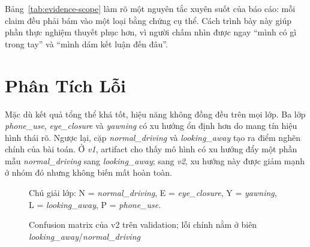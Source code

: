 \documentclass[conference,a4paper]{IEEEtran}
\begin{document}
Bảng~\ref{tab:evidence-scope} làm rõ một nguyên tắc xuyên suốt của báo cáo: mỗi claim đều phải bám vào một loại bằng chứng cụ thể. Cách trình bày này giúp phần thực nghiệm thuyết phục hơn, vì người chấm nhìn được ngay ``mình có gì trong tay'' và ``mình dám kết luận đến đâu''.

\section[Phan Tich Loi]{Phân Tích Lỗi}
Mặc dù kết quả tổng thể khá tốt, hiệu năng không đồng đều trên mọi lớp. Ba lớp \textit{phone\_use}, \textit{eye\_closure} và \textit{yawning} có xu hướng ổn định hơn do mang tín hiệu hình thái rõ. Ngược lại, cặp \textit{normal\_driving} và \textit{looking\_away} tạo ra điểm nghẽn chính của bài toán. Ở \textit{v1}, artifact cho thấy mô hình có xu hướng đẩy một phần mẫu \textit{normal\_driving} sang \textit{looking\_away}; sang \textit{v2}, xu hướng này được giảm mạnh ở nhóm đó nhưng không biến mất hoàn toàn.

\begin{figure}[t]
\caption{Confusion matrix của v2 trên validation; lỗi chính nằm ở biên \textit{looking\_away}/\textit{normal\_driving}}
\label{fig:confusion-matrix}
\centering
{}

\vspace{0.2em}
{\scriptsize Chú giải lớp: N = \textit{normal\_driving}, E = \textit{eye\_closure}, Y = \textit{yawning}, L = \textit{looking\_away}, P = \textit{phone\_use}.}
\end{figure}
\end{document}
